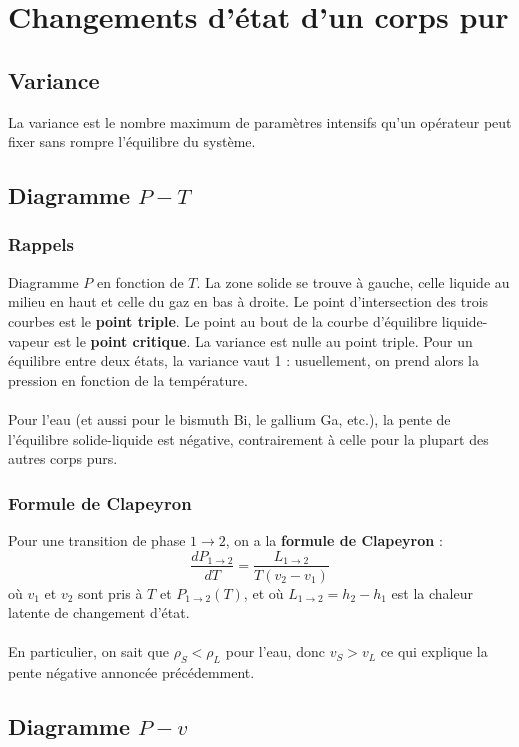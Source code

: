 \documentclass[french]{book}
\theoremstyle{plain}
\theoremstyle{definition}
\theoremstyle{remark}
\begin{document}
\chapter{Changements d'état d'un corps pur}
\localtableofcontents
\section{Variance}
La variance est le nombre maximum de paramètres intensifs qu'un opérateur peut fixer sans rompre l'équilibre du système.
\section{Diagramme $P-T$}
\subsection{Rappels}
Diagramme $P$ en fonction de $T$. La zone solide se trouve à gauche, celle liquide au milieu en haut et celle du gaz en bas à droite. Le point d'intersection des trois courbes est le \textbf{point triple}. Le point au bout de la courbe d'équilibre liquide-vapeur est le \textbf{point critique}. La variance est nulle au point triple. Pour un équilibre entre deux états, la variance vaut 1 : usuellement, on prend alors la pression en fonction de la température. \\ \\ Pour l'eau (et aussi pour le bismuth Bi, le gallium Ga, etc.), la pente de l'équilibre solide-liquide est négative, contrairement à celle pour la plupart des autres corps purs.
\subsection{Formule de Clapeyron}
Pour une transition de phase $1\to 2$, on a la \textbf{formule de Clapeyron} : $$\frac{dP_{1\to 2}}{dT}=\frac{L_{1\to 2}}{T(v_{2}-v_{1})}$$ où $v_1$ et $v_2$ sont pris à $T$ et $P_{1\to 2}(T)$, et où $L_{1\to2}=h_2-h_1$ est la chaleur latente de changement d'état. \\ \\ En particulier, on sait que $\rho_S<\rho_L$ pour l'eau, donc $v_S>v_L$ ce qui explique la pente négative annoncée précédemment.
\section{Diagramme $P-v$}
\end{document}
